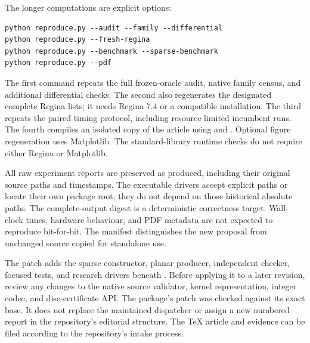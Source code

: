 The longer computations are explicit options:
\begin{lstlisting}
python reproduce.py --audit --family --differential
python reproduce.py --fresh-regina
python reproduce.py --benchmark --sparse-benchmark
python reproduce.py --pdf
\end{lstlisting}
The first command repeats the full frozen-oracle audit, native
family census, and additional differential checks.  The second
also regenerates the designated complete Regina lists; it needs
Regina 7.4 or a compatible installation.  The third repeats the
paired timing protocol, including resource-limited incumbent runs.
The fourth compiles an isolated copy of the article using
 and .  Optional figure regeneration
uses Matplotlib.  The standard-library runtime checks do not
require either Regina or Matplotlib.

All raw experiment reports are preserved as produced, including
their original source paths and timestamps.  The executable
drivers accept explicit paths or locate their own package root;
they do not depend on those historical absolute paths.
The complete-output digest is a deterministic correctness target.
Wall-clock times, hardware behaviour, and PDF metadata are not
expected to reproduce bit-for-bit.  The manifest distinguishes
the new proposal from unchanged source copied for standalone use.

The patch adds the sparse constructor, planar producer, independent
checker, focused tests, and research drivers beneath
.  Before applying it to a
later revision, review any changes to the native source validator,
kernel representation, integer codec, and disc-certificate API.
The package's patch was checked against its exact base.  It does
not replace the maintained dispatcher or assign a new numbered
report in the repository's editorial structure.  The TeX article
and evidence can be filed according to the repository's intake
process.

